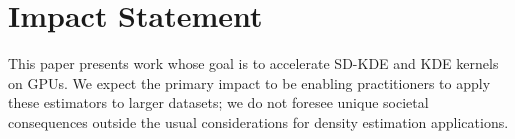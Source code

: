 \section*{Impact Statement}

This paper presents work whose goal is to accelerate SD-KDE and KDE kernels on
GPUs. We expect the primary impact to be enabling practitioners to apply these
estimators to larger datasets; we do not foresee unique societal consequences
outside the usual considerations for density estimation applications.

